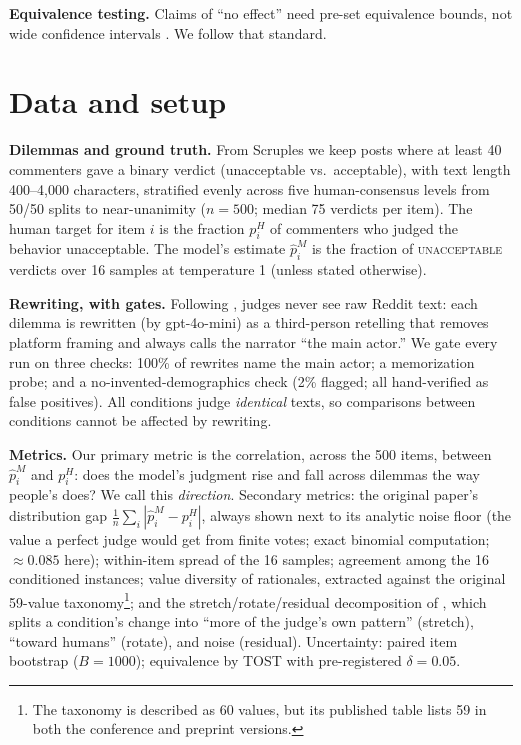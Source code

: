 \documentclass{article}
\begin{document}
\textbf{Equivalence testing.} Claims of ``no effect'' need pre-set equivalence bounds, not wide confidence intervals \citep{schuirmann1987tost,lakens2017equivalence}. We follow that standard.

\section{Data and setup}
\label{sec:setup}

\textbf{Dilemmas and ground truth.} From Scruples \citep{lourie2021scruples} we keep posts where at least 40 commenters gave a binary verdict (unacceptable vs.\ acceptable), with text length 400--4{,}000 characters, stratified evenly across five human-consensus levels from 50/50 splits to near-unanimity ($n=500$; median 75 verdicts per item). The human target for item $i$ is the fraction $p^H_i$ of commenters who judged the behavior unacceptable. The model's estimate $\hat p^M_i$ is the fraction of \textsc{unacceptable} verdicts over 16 samples at temperature 1 (unless stated otherwise).

\textbf{Rewriting, with gates.} Following \citet{russo2026pluralistic}, judges never see raw Reddit text: each dilemma is rewritten (by gpt-4o-mini) as a third-person retelling that removes platform framing and always calls the narrator ``the main actor.'' We gate every run on three checks: 100\% of rewrites name the main actor; a memorization probe; and a no-invented-demographics check (2\% flagged; all hand-verified as false positives). All conditions judge \emph{identical} texts, so comparisons between conditions cannot be affected by rewriting.

\textbf{Metrics.} Our primary metric is the correlation, across the 500 items, between $\hat p^M_i$ and $p^H_i$: does the model's judgment rise and fall across dilemmas the way people's does? We call this \emph{direction}. Secondary metrics: the original paper's distribution gap $\frac{1}{n}\sum_i |\hat p^M_i - p^H_i|$, always shown next to its analytic noise floor (the value a perfect judge would get from finite votes; exact binomial computation; ${\approx}0.085$ here); within-item spread of the 16 samples; agreement among the 16 conditioned instances; value diversity of rationales, extracted against the original 59-value taxonomy\footnote{The taxonomy is described as 60 values, but its published table lists 59 in both the conference and preprint versions.}; and the stretch/rotate/residual decomposition of \citet{mukherjee2026geometry}, which splits a condition's change into ``more of the judge's own pattern'' (stretch), ``toward humans'' (rotate), and noise (residual). Uncertainty: paired item bootstrap ($B{=}1000$); equivalence by TOST with pre-registered $\delta=0.05$.
\end{document}
